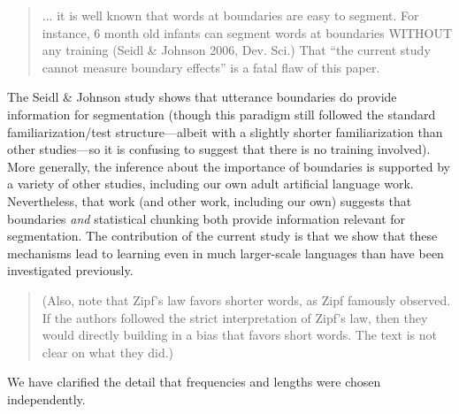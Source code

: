 \documentclass[12pt]{letter}
\begin{document}
\begin{quote}
... it is well known that words at boundaries are easy to segment. For instance, 6 month old infants can segment words at boundaries WITHOUT any training (Seidl \& Johnson 2006, Dev. Sci.) That ``the current study cannot measure boundary effects'' is a fatal flaw of this paper.
\end{quote}

The Seidl \& Johnson study shows that utterance boundaries do provide information for segmentation (though this paradigm still followed the standard familiarization/test structure---albeit with a slightly shorter familiarization than other studies---so it is confusing to suggest that there is no training involved). More generally, the inference about the importance of boundaries is supported by a variety of other studies, including our own adult artificial language work. Nevertheless, that work (and other work, including our own) suggests that boundaries \emph{and} statistical chunking both provide information relevant for segmentation. The contribution of the current study is that we show that these mechanisms lead to learning even in much larger-scale languages than have been investigated previously. 

\begin{quote}
(Also, note that Zipf's law favors shorter words, as Zipf famously observed. If the authors followed the strict interpretation of Zipf's law, then they would directly building in a bias that favors short words. The text is not clear on what they did.)
\end{quote}

We have clarified the detail that frequencies and lengths were chosen independently. 
\end{document}

